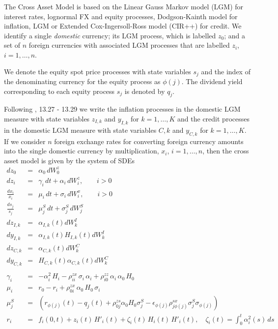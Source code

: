 \documentclass[12pt, a4paper]{article}
\begin{document}
{{\begin{appendix}
The Cross Asset Model is based on the Linear Gauss Markov model (LGM) for interest rates, lognormal FX and equity 
processes, Dodgson-Kainth model for inflation, LGM or Extended Cox-Ingersoll-Ross model (CIR++) for credit.
We identify a single {\em domestic} currency; its LGM process,
which is labelled $z_0$; and a set of $n$ foreign currencies with associated LGM processes that are labelled $z_i$, 
$i=1,\dots,n$. 

We denote the equity spot price processes with state variables $s_j$ and the index of the denominating 
currency for the equity process as $\phi(j)$. The dividend yield corresponding to each equity process $s_j$ is denoted 
by $q_j$.

Following \cite{Lichters}, 13.27 - 13.29 we write the inflation processes 
in the domestic LGM measure with state variables $z_{I,k}$ and $y_{I,k}$ for $k=1,\ldots,K$
and the credit processes in the domestic LGM measure with state variables ${C,k}$ and $y_{C,k}$ for $k=1,\ldots,K$.
If we consider $n$ 
foreign exchange rates for converting foreign currency amounts into the single domestic currency by multiplication, 
$x_i$, $i=1,\dots,n$, then the cross asset model is given by the system of SDEs
\begin{eqnarray*}
dz_0 &=& \alpha_0\,dW_0^z \\
dz_i &=& \gamma_i\,dt + \alpha_i\,dW_i^z,  \qquad i>0 \\
\frac{d x_i}{x_i} &=& \mu_i\, dt + \sigma_i\,dW_i^x, \qquad i > 0 \\
\frac{d s_j}{s_j} &=& \mu_j^S\, dt + \sigma_j^S\,dW_j^S \\
dz_{I,k} &=& \alpha_{I,k}(t)dW_k^I \\
dy_{I,k} &=& \alpha_{I,k}(t)H_{I,k}(t)dW_k^I \\
dz_{C,k} &=& \alpha_{C,k}(t)dW_k^C \\
dy_{C,k} &=& H_{C,k}(t)\alpha_{C,k}(t)dW_k^C \\ \\
\gamma_i &=&
-\alpha_i^2\,H_i -\rho_{ii}^{zx}\,\sigma_i\,\alpha_i + \rho_{i0}^{zz}\,\alpha_i\,\alpha_0\,H_0\\
\mu_i &=& r_0 - r_i + \rho_{0i}^{zx}\,\alpha_0\,H_0\,\sigma_i\\
\mu_j^S &=& (r_{\phi(j)}(t) - q_j(t) + \rho_{0j}^{zs} \alpha_0 H_0 \sigma_j^S - \epsilon_{\phi(j)}
\rho_{j \phi(j)}^{sx}\sigma_j^S \sigma_{\phi(j)}) \\
r_i &=& f_i(0,t) + z_i(t)\,H'_i(t) + \zeta_i(t)\,H_i(t)\,H'_i(t),
\quad \zeta_i(t) = \int_0^t \alpha_i^2(s)\,ds  \\ \\

\end{eqnarray*}
\end{appendix}}}
\end{document}
